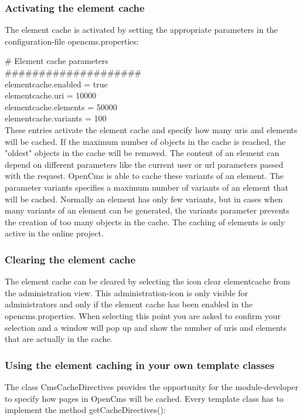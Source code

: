 \subsubsection{Activating the element cache}
The element cache is activated by setting the appropriate parameters 
in the configuration-file opencms.properties:

\# Element cache parameters\\
\#\#\#\#\#\#\#\#\#\#\#\#\#\#\#\#\#\#\#\#\\
elementcache.enabled = true\\
elementcache.uri = 10000\\
elementcache.elements = 50000\\
elementcache.variants = 100\\

These entries activate the element cache and specify how many uris and elements 
will be cached. If the maximum number of objects in the cache is reached, 
the "oldest" objects in the cache will be removed. 
The content of an element can depend on different parameters like the current user 
or url parameters passed with the request. OpenCms is able to cache these variants 
of an element. The parameter variants specifies a maximum number of variants of an element 
that will be cached. Normally an element has only few variants, but in cases when many variants of
an element can be generated, the variants parameter prevents the creation of too many objects 
in the cache. The caching of elements is only active in the online project.

\subsubsection{Clearing the element cache} 
The element cache can be cleared by selecting the icon clear elementcache from 
the administration view. This administration-icon is only visible for administrators 
and only if the element cache has been enabled in the opencms.properties. 
When selecting this point you are asked to confirm your selection and a window will 
pop up and show the number of uris and elements that are actually in the cache.

\subsubsection{Using the element caching in your own template classes}
The class {\class CmsCacheDirectives}  provides the opportunity for the module-developer
to specify how pages in OpenCms will be cached. 
Every template class has to implement the method {\meth getCacheDirectives()}:

